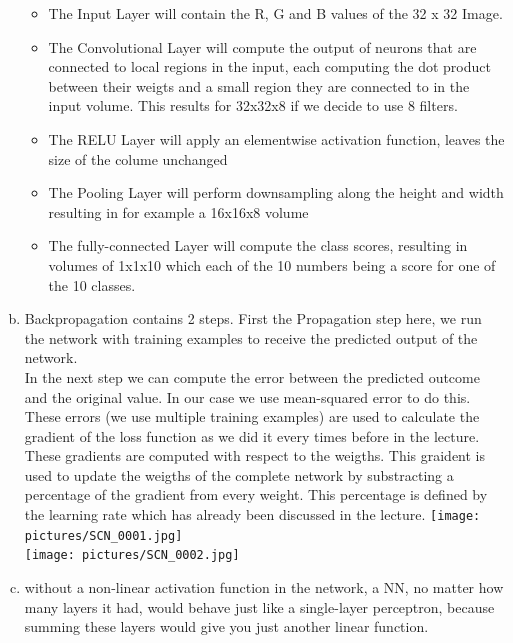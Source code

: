 \documentclass[12pt]{article}
\begin{document}
\begin{enumerate}[a)]
        \begin{itemize}
            \item 
                The Input Layer will contain the R, G and B values of the 32 x 32 Image. 
            \item
                The Convolutional Layer will compute the output of neurons that are connected to local regions in the input, each computing the dot product between their weigts and a small region they are connected to in the input volume. This results for 32x32x8 if we decide to use 8 filters.
            \item
                The RELU Layer will apply an elementwise activation function, leaves the size of the colume unchanged
            \item
                The Pooling Layer will perform downsampling along the height and width resulting in for example a 16x16x8 volume
            \item
                The fully-connected Layer will compute the class scores, resulting in volumes of 1x1x10 which each of the 10 numbers being a score for one of the 10 classes.
        \end{itemize}
    \item
    	Backpropagation contains 2 steps. First the Propagation step here, we run the network with training examples to receive the predicted output of the network. \\
    	In the next step we can compute the error between the predicted outcome and the original value. In our case we use mean-squared error to do this.\\
    	These errors (we use multiple training examples) are used to calculate the gradient of the loss function as we did it every times before in the lecture.\\
    	These gradients are computed with respect to the weigths. This graident is used to update the weigths of the complete network by substracting a percentage of the gradient from every weight. This percentage is defined by the learning rate which has already been discussed in the lecture.
    	\newpage
	\texttt{[image: pictures/SCN\_0001.jpg]}\\
	\texttt{[image: pictures/SCN\_0002.jpg]}\\
    \item
        without a non-linear activation function in the network, a NN, no matter how many layers it had, would behave just like a single-layer perceptron, because summing these layers would give you just another linear function.\\


\end{enumerate}
\end{document}
